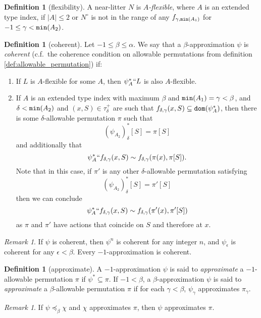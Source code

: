 \documentclass{article}
\theoremstyle{definition}
\newtheorem{definition}[theorem]{Definition}
\theoremstyle{remark}
\newtheorem{remark}[theorem]{Remark}
\begin{document}
\begin{definition}[flexibility]\label{def:flexible}
  A near-litter $N$ is {\em  $A$-flexible\/}, where $A$ is an extended type index,  if $|A| \leq 2$ or $N^\circ$ is not in the range of any $f_{\gamma,{\tt min}(A_1)}$
for $-1 \leq \gamma<{\tt min}(A_2)$.
\end{definition}
\begin{definition}[coherent]\label{def:coherent}
  Let $-1 \leq \beta \leq \alpha$.
  We say that a $\beta$-approximation $\psi$ is {\em coherent\/} (c.f.\ the coherence condition on allowable permutations from definition \ref{def:allowable_permutation}) if:
  \begin{enumerate}
    \item If $L$ is $A$-flexible for some $A$, then $\psi_A^*`` L$ is also $A$-flexible.
    \item If $A$ is an extended type index with maximum $\beta$ and ${\tt min}(A_1) = \gamma < \beta$, and $\delta < {\tt min}(A_2)$ and $(x, S) \in \tau_\delta^+$ are such that $f_{\delta,\gamma}(x, S) \subseteq {\tt dom}(\psi_A^*)$, then there is some $\delta$-allowable permutation $\pi$ such that
    $$ (\psi_{A_2})_\delta^*[S] = \pi[S] $$
    and additionally that
    $$ \psi_A^* `` f_{\delta,\gamma}(x, S) \sim f_{\delta,\gamma}(\pi(x), \pi[S]). $$
    Note that in this case, if $\pi'$ is any other $\delta$-allowable permutation satisfying
    $$ (\psi_{A_2})_\delta^*[S] = \pi'[S] $$
    then we can conclude
    $$ \psi_A^* `` f_{\delta,\gamma}(x, S) \sim f_{\delta,\gamma}(\pi'(x), \pi'[S]) $$
    as $\pi$ and $\pi'$ have actions that coincide on $S$ and therefore at $x$.
  \end{enumerate}
\end{definition}
\begin{remark}\label{rk:power_deriv_coherent}
  If $\psi$ is coherent, then $\psi^n$ is coherent for any integer $n$, and $\psi_\epsilon$ is coherent for any $\epsilon < \beta$.
  Every $-1$-approximation is coherent.
\end{remark}
\begin{definition}[approximate]
  A $-1$-approximation $\psi$ is said to {\em approximate\/} a $-1$-allowable permutation $\pi$ if $\psi^* \subseteq \pi$.
  If $-1 < \beta$, a $\beta$-approximation $\psi$ is said to {\em approximate\/} a $\beta$-allowable permutation $\pi$ if for each $\gamma < \beta$, $\psi_\gamma$ approximates $\pi_\gamma$.
\end{definition}
\begin{remark}\label{rk:preceq_approximates}
  If $\psi \preceq_\beta \chi$ and $\chi$ approximates $\pi$, then $\psi$ approximates $\pi$.
\end{remark}
\end{document}
